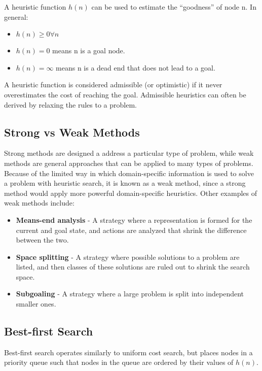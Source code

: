 \documentclass[12pt,titlepage]{article}
\begin{document}
      A heuristic function $h(n)$ can be used to estimate the ``goodness'' of node n. In general:
      \begin{itemize}
        \item $h(n) \geq 0 \forall n$
        \item $h(n) = 0$ means n is a goal node.
        \item $h(n) = \infty$ means n is a dead end that does not lead to a goal.
      \end{itemize}

      A heuristic function is considered admissible (or optimistic) if it never overestimates the cost of reaching the goal.
      Admissible heuristics can often be derived by relaxing the rules to a problem.

    \subsection{Strong vs Weak Methods}
      Strong methods are designed a address a particular type of problem, while weak methods are general approaches that can be applied
      to many types of problems. Because of the limited way in which domain-specific information is used to solve a problem with heuristic
      search, it is known as a weak method, since a strong method would apply more powerful domain-specific heuristics. Other examples of
      weak methods include:
      \begin{itemize}
        \item \textbf{Means-end analysis} - A strategy where a representation is formed for the current and goal state, and actions are
        analyzed that shrink the difference between the two.
        \item \textbf{Space splitting} - A strategy where possible solutions to a problem are listed, and then classes of these solutions
        are ruled out to shrink the search space.
        \item \textbf{Subgoaling} - A strategy where a large problem is split into independent smaller ones.
      \end{itemize}

    \subsection{Best-first Search}
      Best-first search operates similarly to uniform cost search, but places nodes in a priority queue such that nodes in the queue are
      ordered by their values of $h(n)$.
\end{document}
